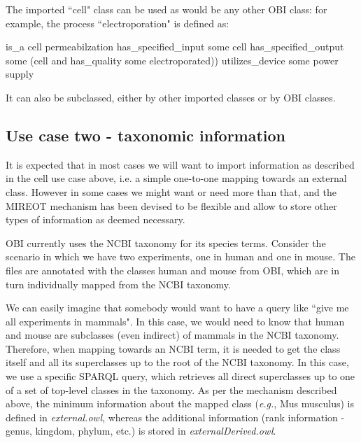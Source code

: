 \documentclass{elsart3p}    %
\def\sourcetabsize{4}
\newenvironment{sourcestyle}{\begin{scriptsize}}{\end{scriptsize}}
\begin{document}
The imported ``cell" class can be used as would be any other OBI class: for example, the process ``electroporation" is defined as:

\begin{sourcestyle}%
\begin{verbatimtab}[\sourcetabsize]
      is_a cell permeabilzation
      has_specified_input some cell
      has_specified_output some 
	    (cell and has_quality some electroporated))
      utilizes_device some power supply
   
\end{verbatimtab}%
\end{sourcestyle}


It can also be subclassed, either by other imported classes or by OBI classes.

\subsection*{Use case two - taxonomic information}

It is expected that in most cases we will want to import information as described in the cell use case above, i.e. a simple one-to-one mapping towards an external class. However in some cases we might want or need more than that, and the MIREOT mechanism has been devised to be flexible and allow to store other types of information as deemed necessary.

OBI currently uses the NCBI taxonomy for its species terms. 
Consider the scenario in which we have two experiments, one in human and one in mouse. The files are annotated with the classes human and mouse from OBI, which are in turn individually mapped from the NCBI taxonomy.

We can easily imagine that somebody would want to have a query like ``give me all experiments in mammals". In this case, we would need to know that human and mouse are subclasses (even indirect) of mammals in the NCBI taxonomy.
Therefore, when mapping towards an NCBI term, it is needed to get the class itself and all its superclasses up to the root of the NCBI taxonomy.
In this case, we use a specific SPARQL query, which retrieves all direct superclasses up to one of a set of top-level classes in the taxonomy.%
As per the mechanism described above, the minimum information about the mapped class (\emph{e.g.}, Mus musculus) is defined in \emph{external.owl}, whereas the additional information (rank information - genus, kingdom, phylum, etc.) is stored in \emph{ externalDerived.owl}. 
\end{document}
